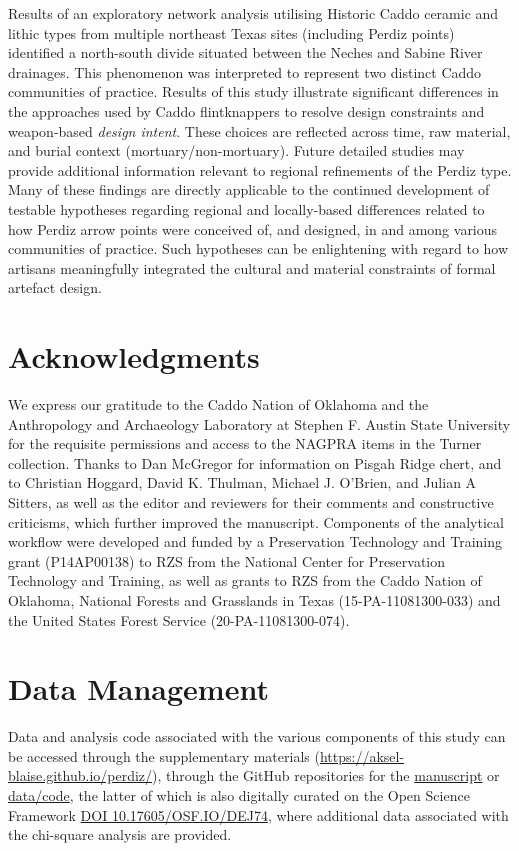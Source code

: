 \documentclass[review]{elsarticle}
\begin{document}
Results of an exploratory network analysis utilising Historic Caddo ceramic and lithic types from multiple northeast Texas sites (including Perdiz points) identified a north-south divide situated between the Neches and Sabine River drainages. This phenomenon was interpreted to represent two distinct Caddo communities of practice. Results of this study illustrate significant differences in the approaches used by Caddo flintknappers to resolve design constraints and weapon-based \textit{design intent}. These choices are reflected across time, raw material, and burial context (mortuary/non-mortuary). Future detailed studies may provide additional information relevant to regional refinements of the Perdiz type. Many of these findings are directly applicable to the continued development of testable hypotheses regarding regional and locally-based differences related to how Perdiz arrow points were conceived of, and designed, in and among various communities of practice. Such hypotheses can be enlightening with regard to how artisans meaningfully integrated the cultural and material constraints of formal artefact design.

\section*{Acknowledgments}

We express our gratitude to the Caddo Nation of Oklahoma and the Anthropology and Archaeology Laboratory at Stephen F. Austin State University for the requisite permissions and access to the NAGPRA items in the Turner collection. Thanks to Dan McGregor for information on Pisgah Ridge chert, and to Christian Hoggard, David K. Thulman, Michael J. O'Brien, and Julian A Sitters, as well as the editor and reviewers for their comments and constructive criticisms, which further improved the manuscript. Components of the analytical workflow were developed and funded by a Preservation Technology and Training grant (P14AP00138) to RZS from the National Center for Preservation Technology and Training, as well as grants to RZS from the Caddo Nation of Oklahoma, National Forests and Grasslands in Texas (15-PA-11081300-033) and the United States Forest Service (20-PA-11081300-074).

\section*{Data Management}

Data and analysis code associated with the various components of this study can be accessed through the supplementary materials (\href{https://aksel-blaise.github.io/perdiz/}{https://aksel-blaise.github.io/perdiz/}), through the GitHub repositories for the \href{https://github.com/aksel-blaise/perdiz-manu}{manuscript} or \href{https://github.com/aksel-blaise/perdiz}{data/code}, the latter of which is also digitally curated on the Open Science Framework \href{https://osf.io/dej74/}{DOI 10.17605/OSF.IO/DEJ74}, where additional data associated with the chi-square analysis are provided.


\end{document}
